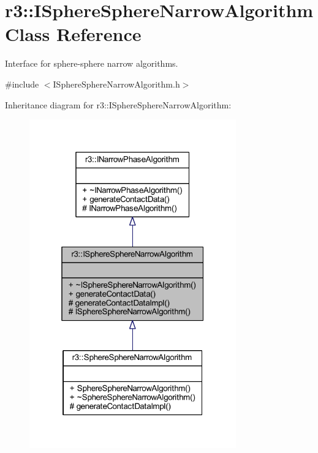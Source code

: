 \hypertarget{classr3_1_1_i_sphere_sphere_narrow_algorithm}{}\section{r3\+:\+:I\+Sphere\+Sphere\+Narrow\+Algorithm Class Reference}
\label{classr3_1_1_i_sphere_sphere_narrow_algorithm}


Interface for sphere-\/sphere narrow algorithms.  




{\ttfamily \#include $<$I\+Sphere\+Sphere\+Narrow\+Algorithm.\+h$>$}



Inheritance diagram for r3\+:\+:I\+Sphere\+Sphere\+Narrow\+Algorithm\+:\nopagebreak
\begin{figure}[H]
\begin{center}
\leavevmode
\includegraphics[width=253pt]{classr3_1_1_i_sphere_sphere_narrow_algorithm__inherit__graph}
\end{center}
\end{figure}


